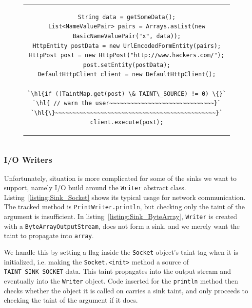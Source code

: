 \documentclass[12pt,twoside,notitlepage]{report}
\begin{document}
\begin{figure}[h]
	\centering
	\begin{tabular}{c}
	\begin{lstlisting}
String data = getSomeData();
List<NameValuePair> pairs = Arrays.asList(new BasicNameValuePair("x", data));
HttpEntity postData = new UrlEncodedFormEntity(pairs);
HttpPost post = new HttpPost("http://www.hackers.com/");
post.setEntity(postData);
DefaultHttpClient client = new DefaultHttpClient();

`\hl{if ((TaintMap.get(post) \& TAINT\_SOURCE) != 0) \{}`
`\hl{ // warn the user~~~~~~~~~~~~~~~~~~~~~~~~~~~~~~}`
`\hl{\}~~~~~~~~~~~~~~~~~~~~~~~~~~~~~~~~~~~~~~~~~~~~~~}`
client.execute(post);
	\end{lstlisting}
	\end{tabular}
	\begin{lstlisting}[caption={HTTP request using the Apache client, with sink instrumentation},
	                   label={listing:Sink_ApacheHTTPClient}]
	\end{lstlisting}
\end{figure}

\subsubsection{I/O Writers}

Unfortunately, situation is more complicated for some of the sinks we want to support, namely I/O build around the \verb$Writer$ abstract class. Listing~\ref{listing:Sink_Socket} shows its typical usage for network communication. The tracked method is \verb$PrintWriter.println$, but checking only the taint of the argument is insufficient. In listing~\ref{listing:Sink_ByteArray}, \verb$Writer$ is created with a \verb$ByteArrayOutputStream$, does not form a sink, and we merely want the taint to propagate into \verb$array$. 

We handle this by setting a flag inside the \verb$Socket$ object's taint tag when it is initialized, i.e. making the \verb$Socket.<init>$ method a source of \verb$TAINT_SINK_SOCKET$ data. This taint propagates into the output stream and eventually into the \verb$Writer$ object. Code inserted for the \verb$println$ method then checks whether the object it is called on carries a sink taint, and only proceeds to checking the taint of the argument if it does.
\end{document}
